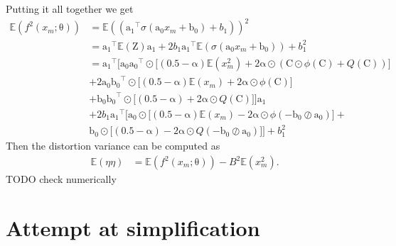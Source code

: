 \documentclass[12pt]{article}
\newcommand{\vect}[1]{\boldsymbol{\mathrm{#1}}}
\newcommand{\mat}[1]{\boldsymbol{\mathrm{#1}}}
\newcommand{\TODO}[1]{{\color{red} TODO {#1}}}
\newcommand{\expt}[1]{\mathbb{E}\left(#1\right)}
\theoremstyle{remark}
\begin{document}
Putting it all together we get 
\begin{align*}
	\expt{f^2(x_m; \vect{\theta})} &= \expt{\left(\vect{a_1}^{\intercal}\sigma(\vect{a_0}x_m + \vect{b_0}) + b_1\right)}^2\\
	&= \vect{a_1}^{\intercal}{\expt{\mat{Z}}}\vect{a_1} + 2b_1 \vect{a_1}^{\intercal} \expt{\sigma(\vect{a_0}x_m + \vect{b_0})} + b_1^2\\
	&=  \vect{a_1}^{\intercal}\Bigg[\vect{a_0} \vect{a_0}^{\intercal} \odot \big[(0.5-\vect{\alpha})\expt{x_m^2} + 2\vect{\alpha} \odot \left(\mat{C} \odot \phi(\mat{C}) + Q(\mat{C})\right) \big] \\
	&+2 \vect{a_0}\vect{b_0}^{\intercal} \odot \big[(0.5-\vect{\alpha})\expt{x_m} + 2\vect{\alpha} \odot \phi(\mat{C})\big] \\
	&+\vect{b_0}\vect{b_0}^{\intercal} \odot \big[(0.5-\vect{\alpha}) + 2\vect{\alpha} \odot Q(\mat{C})\big]\Bigg]\vect{a_1}\\
	&+ 2 b_1 \vect{a_1}^{\intercal} \Bigg[ \vect{a_0} \odot \big[(0.5-\vect{\alpha}) \expt{x_m} - 2\vect{\alpha} \odot \phi(-\vect{b_0} \oslash \vect{a_0}) \big]+\\
	& \vect{b_0} \odot \big[(0.5 - \vect{\alpha}) - 2 \vect{\alpha} \odot Q(-\vect{b_0} \oslash \vect{a_0})\big]\Bigg] +b_1^2
\end{align*}
Then the distortion variance can be computed as
\begin{align*}
	\expt{\eta \eta} &= \expt{f^2(x_m; \vect{\theta})} - B^2\expt{x_m^2}.
\end{align*}
\TODO{check numerically}



\section{Attempt at simplification}
\end{document}
